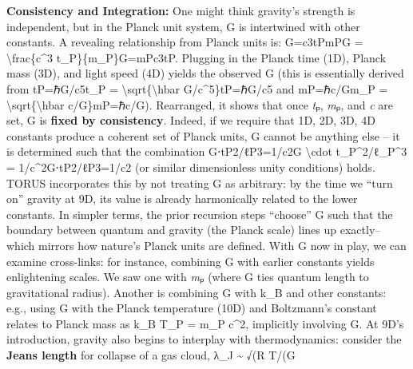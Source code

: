 \documentclass[
]{article}
\begin{document}
\textbf{Consistency and Integration:} One might think gravity's strength
is independent, but in the Planck unit system, G is intertwined with
other constants. A revealing relationship from Planck units is:
G=c3tPmPG = \textbackslash frac\{c\^{}3
t\_P\}\{m\_P\}G=mP\hspace{0pt}c3tP\hspace{0pt}\hspace{0pt}\hspace{0pt}.
Plugging in the Planck time (1D), Planck mass (3D), and light speed (4D)
yields the observed G (this is essentially derived from tP=ℏG/c5t\_P =
\textbackslash sqrt\{\textbackslash hbar
G/c\^{}5\}tP\hspace{0pt}=ℏG/c5\hspace{0pt} and mP=ℏc/Gm\_P =
\textbackslash sqrt\{\textbackslash hbar
c/G\}mP\hspace{0pt}=ℏc/G\hspace{0pt}). Rearranged, it shows that once
\emph{t}ₚ, \emph{m}ₚ, and \emph{c} are set, G is \textbf{fixed by
consistency}\hspace{0pt}. Indeed, if we require that 1D, 2D, 3D, 4D
constants produce a coherent set of Planck units, G cannot be anything
else -- it is determined such that the combination G⋅tP2/ℓP3=1/c2G
\textbackslash cdot t\_P\^{}2/ℓ\_P\^{}3 =
1/c\^{}2G⋅tP2\hspace{0pt}/ℓP3\hspace{0pt}=1/c2 (or similar dimensionless
unity conditions) holds\hspace{0pt}. TORUS incorporates this by not
treating G as arbitrary: by the time we ``turn on'' gravity at 9D, its
value is already harmonically related to the lower
constants\hspace{0pt}. In simpler terms, the prior recursion steps
``choose'' G such that the boundary between quantum and gravity (the
Planck scale) lines up exactly\hspace{0pt}-- which mirrors how nature's
Planck units are defined. With G now in play, we can examine
cross-links: for instance, combining G with earlier constants yields
enlightening scales. We saw one with \emph{m}ₚ (where G ties quantum
length to gravitational radius). Another is combining G with k\_B and
other constants: e.g., using G with the Planck temperature (10D) and
Boltzmann's constant relates to Planck mass as k\_B T\_P = m\_P c\^{}2,
implicitly involving G\hspace{0pt}. At 9D's introduction, gravity also
begins to interplay with thermodynamics: consider the \textbf{Jeans
length} for collapse of a gas cloud, λ\_J \textasciitilde{} √(R T/(G
\end{document}
